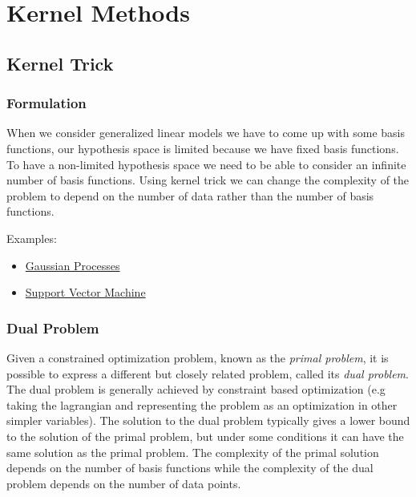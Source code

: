 \documentclass[12pt]{article}
\begin{document}
\section{Kernel Methods}    
    \subsection{Kernel Trick}
        \subsubsection{Formulation}
            When we consider generalized linear models we have to come up with some basis functions, our hypothesis
            space is limited because we have fixed basis functions. To have a non-limited hypothesis space we need to be
            able to consider an infinite number of basis functions. Using kernel trick we can change the complexity of
            the problem to depend on the number of data rather than the number of basis functions.

            Examples:
            \begin{itemize}
                \item \hyperref[sec:GaussianProcesses]{Gaussian Processes}
                \item \hyperref[sec:SVM]{Support Vector Machine}
            \end{itemize}
        
        \subsubsection{Dual Problem}
            Given a constrained optimization problem, known as the \textit{primal problem}\label{fact:PrimalProblem}, it
            is possible to express a different but closely related problem, called its \textit{dual
            problem}\label{fact:DualProblem}. The dual problem is generally achieved by constraint based optimization
            (e.g taking the lagrangian and representing the problem as an optimization in other simpler variables). The
            solution to the dual problem typically gives a lower bound to the solution of the primal problem, but under
            some conditions it can have the same solution as the primal problem. The complexity of the primal solution
            depends on the number of basis functions while the complexity of the dual problem depends on the number of
            data points.
        
\end{document}
